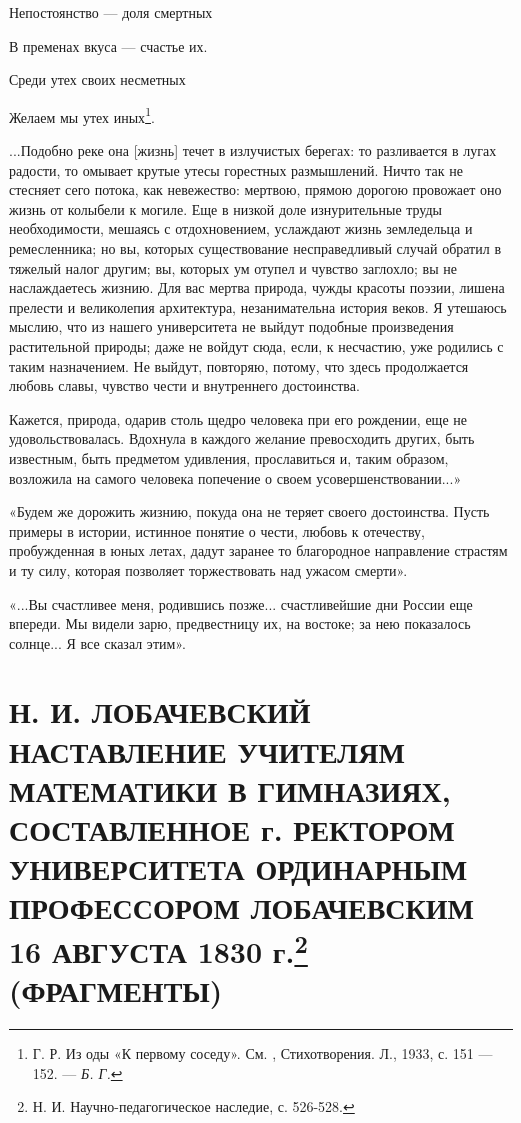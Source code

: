 \documentclass[12pt, a4paper, openany]{book}
\begin{document}
\qquad \qquad \qquad \qquad Непостоянство — доля смертных 

\qquad \qquad \qquad \qquad В пременах вкуса — счастье их. 

\qquad \qquad \qquad \qquad Среди утех своих несметных 

\qquad \qquad \qquad \qquad  Желаем мы утех иных{\footnote{ Г. Р. Из оды «К первому соседу». См. , Стихотворения. Л., 1933, с. 151 — 152. — \textit{Б. Г.}}}.

...Подобно реке она [жизнь] течет в излучистых  берегах: то разливается в лугах радости, то омывает крутые утесы горестных размышлений. Ничто так не стесняет сего потока, как невежество: мертвою, прямою дорогою  провожает оно жизнь от колыбели к могиле. Еще в низкой доле изнурительные труды необходимости, мешаясь с  отдохновением, услаждают жизнь земледельца и ремесленника; но вы, которых существование несправедливый случай  обратил в тяжелый налог другим; вы, которых ум отупел и чувство заглохло; вы не наслаждаетесь жизнию. Для вас мертва природа, чужды красоты поэзии, лишена прелести и великолепия архитектура, незанимательна история веков. Я утешаюсь мыслию, что из нашего университета не выйдут подобные произведения растительной природы; даже не войдут сюда, если, к несчастию, уже родились с таким назначением. Не выйдут, повторяю, потому, что здесь продолжается любовь славы, чувство чести и  внутреннего достоинства. 

Кажется, природа, одарив столь щедро человека при его рождении, еще не удовольствовалась. Вдохнула в каждого желание превосходить других, быть известным, быть  предметом удивления, прославиться и, таким образом,  возложила на самого человека попечение о своем  усовершенствовании...» 

«Будем же дорожить жизнию, покуда она не теряет своего достоинства. Пусть примеры в истории, истинное понятие о чести, любовь к отечеству, пробужденная в юных летах, дадут заранее то благородное направление страстям и ту силу, которая позволяет торжествовать над ужасом смерти». 

«...Вы счастливее меня, родившись позже...  счастливейшие дни России еще впереди. Мы видели зарю,  предвестницу их, на востоке; за нею показалось солнце... Я все сказал этим». 


\section[\textls{Н. И. Лобачевский}. Наставление учителям математики в гимназиях, составленное г. ректором университета ординарным профессором Лобачевским 16 августа 1830 г. (фрагменты)]{{\small Н. И. ЛОБАЧЕВСКИЙ} \\ \textbf{НАСТАВЛЕНИЕ УЧИТЕЛЯМ МАТЕМАТИКИ В ГИМНАЗИЯХ, СОСТАВЛЕННОЕ г. РЕКТОРОМ УНИВЕРСИТЕТА ОРДИНАРНЫМ ПРОФЕССОРОМ ЛОБАЧЕВСКИМ 16 АВГУСТА 1830 г.{\footnote{ Н. И. Научно-педагогическое наследие, с. 526-528. }}} (ФРАГМЕНТЫ)}
\end{document}
